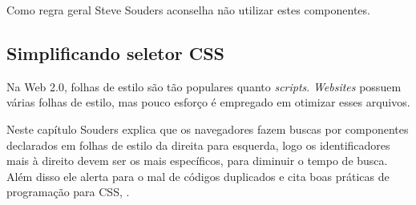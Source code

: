 Como regra geral Steve Souders aconselha não utilizar estes componentes.

\subsection{Simplificando seletor CSS}
\label{subsec:evenfaster_cap14}
Na Web 2.0, folhas de estilo são tão populares quanto \textit{scripts}. \textit{Websites} possuem várias folhas de estilo, mas pouco esforço é empregado em otimizar esses arquivos.

Neste capítulo Souders explica que os navegadores fazem buscas por componentes declarados em folhas de estilo da direita para esquerda, logo os identificadores mais à direito devem ser os mais específicos, para diminuir o tempo de busca. Além disso ele alerta para o mal de códigos duplicados e cita boas práticas de programação para CSS, \cite[p.~195]{EvenFaster}.
